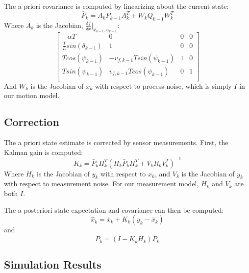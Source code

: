 \documentclass[11pt]{article} %
\begin{document}
The a priori covariance is computed by linearizing about the current state:
\begin{equation}
\bar{P}_k = A_kP_{k-1}A_k^T + W_kQ_{k-1}W_k^T
\end{equation}
Where $A_k$ is the Jacobian, $\frac{\delta f}{\delta x} | _{\hat{x}_{k-1}, u_{k-1}}$:
\renewcommand{\arraystretch}{1.4}
\begin{equation}
\left[ \begin{array}{cccc}
-\alpha T & 0 & 0 & 0 \\
\frac{T}{L} sin( \delta _{k-1} ) & 1 & 0 & 0 \\
T cos(\psi _{k-1}) & - v_{f,k-1} T sin( \psi _{k-1}) & 1 & 0 \\
T sin(\psi _{k-1}) & v_{f,k-1} T cos ( \psi _{k-1}) & 0 & 1 \\
\end{array} \right]
\end{equation}
\renewcommand{\arraystretch}{1}
And $W_k$ is the Jacobian of $x_k$ with respect to process noise, which is simply $I$ in our motion model.

\subsection{Correction}

The a priori state estimate is corrected by sensor measurements.  First, the Kalman gain is computed:
\begin{equation}
K_k = \bar{P}_k H_k^T ( H_k \bar{P}_k H_k^T + V_k R_k V_k^T ) ^{-1}
\end{equation}
Where $H_k$ is the Jacobian of $y_k$ with respect to $x_k$, and $V_k$ is the Jacobian of $y_k$ with respect to measurement noise.   For our measurement model, $H_k$ and $V_k$ are both $I$.

The a posteriori state expectation and covariance can then be computed:
\begin{equation}
\hat{x}_k = \bar{x}_k + K_k (y_k - \bar{x}_k)
\end{equation}
and
\begin{equation}
P_k = (I - K_k H_k) \bar{P}_k
\end{equation}

\subsection{Simulation Results}
\end{document}
